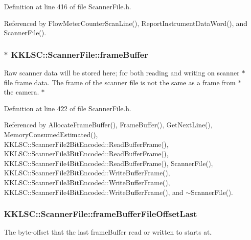 Definition at line 416 of file Scanner\+File.\+h.



Referenced by Flow\+Meter\+Counter\+Scan\+Line(), Report\+Instrument\+Data\+Word(), and Scanner\+File().

\subsubsection[{\texorpdfstring{frame\+Buffer}{frameBuffer}}]{$\ast$ K\+K\+L\+S\+C\+::\+Scanner\+File\+::frame\+Buffer\hspace{0.3cm}{\ttfamily [protected]}}\hypertarget{class_k_k_l_s_c_1_1_scanner_file_ab07c8ac594c6c8324e3078c8d4085633}{}\label{class_k_k_l_s_c_1_1_scanner_file_ab07c8ac594c6c8324e3078c8d4085633}
Raw scanner data will be stored here; for both reading and writing on scanner $\ast$ file frame data. The frame of the scanner file is not the same as a frame from $\ast$ the camera. $\ast$ 

Definition at line 422 of file Scanner\+File.\+h.



Referenced by Allocate\+Frame\+Buffer(), Frame\+Buffer(), Get\+Next\+Line(), Memory\+Consumed\+Estimated(), K\+K\+L\+S\+C\+::\+Scanner\+File2\+Bit\+Encoded\+::\+Read\+Buffer\+Frame(), K\+K\+L\+S\+C\+::\+Scanner\+File3\+Bit\+Encoded\+::\+Read\+Buffer\+Frame(), K\+K\+L\+S\+C\+::\+Scanner\+File4\+Bit\+Encoded\+::\+Read\+Buffer\+Frame(), Scanner\+File(), K\+K\+L\+S\+C\+::\+Scanner\+File2\+Bit\+Encoded\+::\+Write\+Buffer\+Frame(), K\+K\+L\+S\+C\+::\+Scanner\+File3\+Bit\+Encoded\+::\+Write\+Buffer\+Frame(), K\+K\+L\+S\+C\+::\+Scanner\+File4\+Bit\+Encoded\+::\+Write\+Buffer\+Frame(), and $\sim$\+Scanner\+File().

\subsubsection[{\texorpdfstring{frame\+Buffer\+File\+Offset\+Last}{frameBufferFileOffsetLast}}]{ K\+K\+L\+S\+C\+::\+Scanner\+File\+::frame\+Buffer\+File\+Offset\+Last\hspace{0.3cm}{\ttfamily [protected]}}\hypertarget{class_k_k_l_s_c_1_1_scanner_file_a90c4adfddeadda2794d0b643e5311a2b}{}\label{class_k_k_l_s_c_1_1_scanner_file_a90c4adfddeadda2794d0b643e5311a2b}
The byte-\/offset that the last frame\+Buffer read or written to starts at. 

